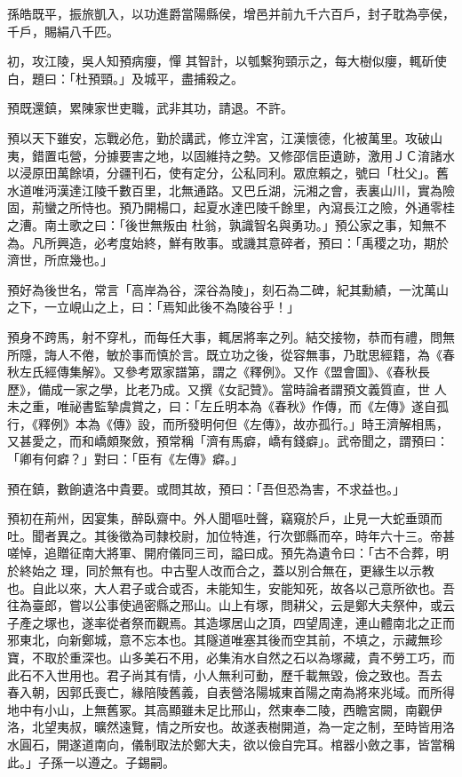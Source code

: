 \begin{pinyinscope}
 孫皓既平，振旅凱入，以功進爵當陽縣侯，增邑并前九千六百戶，封子耽為亭侯，千戶，賜絹八千匹。



 初，攻江陵，吳人知預病癭，憚
 其智計，以瓠繫狗頸示之，每大樹似癭，輒斫使白，題曰：「杜預頸。」及城平，盡捕殺之。



 預既還鎮，累陳家世吏職，武非其功，請退。不許。



 預以天下雖安，忘戰必危，勤於講武，修立泮宮，江漢懷德，化被萬里。攻破山夷，錯置屯營，分據要害之地，以固維持之勢。又修邵信臣遺跡，激用ＪＣ淯諸水以浸原田萬餘頃，分疆刊石，使有定分，公私同利。眾庶賴之，號曰「杜父」。舊水道唯沔漢達江陵千數百里，北無通路。又巴丘湖，沅湘之會，表裏山川，實為險固，荊蠻之所恃也。預乃開楊口，起夏水達巴陵千餘里，內瀉長江之險，外通零桂之漕。南土歌之曰：「後世無叛由
 杜翁，孰識智名與勇功。」預公家之事，知無不為。凡所興造，必考度始終，鮮有敗事。或譏其意碎者，預曰：「禹稷之功，期於濟世，所庶幾也。」



 預好為後世名，常言「高岸為谷，深谷為陵」，刻石為二碑，紀其勳績，一沈萬山之下，一立峴山之上，曰：「焉知此後不為陵谷乎！」



 預身不跨馬，射不穿札，而每任大事，輒居將率之列。結交接物，恭而有禮，問無所隱，誨人不倦，敏於事而慎於言。既立功之後，從容無事，乃耽思經籍，為《春秋左氏經傳集解》。又參考眾家譜第，謂之《釋例》。又作《盟會圖》、《春秋長歷》，備成一家之學，比老乃成。又撰《女記贊》。當時論者謂預文義質直，世
 人未之重，唯祕書監摯虞賞之，曰：「左丘明本為《春秋》作傳，而《左傳》遂自孤行，《釋例》本為《傳》設，而所發明何但《左傳》，故亦孤行。」時王濟解相馬，又甚愛之，而和嶠頗聚斂，預常稱「濟有馬癖，嶠有錢癖」。武帝聞之，謂預曰：「卿有何癖？」對曰：「臣有《左傳》癖。」



 預在鎮，數餉遺洛中貴要。或問其故，預曰：「吾但恐為害，不求益也。」



 預初在荊州，因宴集，醉臥齋中。外人聞嘔吐聲，竊窺於戶，止見一大蛇垂頭而吐。聞者異之。其後徵為司隸校尉，加位特進，行次鄧縣而卒，時年六十三。帝甚嗟悼，追贈征南大將軍、開府儀同三司，謚曰成。預先為遺令曰：「古不合葬，明於終始之
 理，同於無有也。中古聖人改而合之，蓋以別合無在，更緣生以示教也。自此以來，大人君子或合或否，未能知生，安能知死，故各以己意所欲也。吾往為臺郎，嘗以公事使過密縣之邢山。山上有塚，問耕父，云是鄭大夫祭仲，或云子產之塚也，遂率從者祭而觀焉。其造塚居山之頂，四望周達，連山體南北之正而邪東北，向新鄭城，意不忘本也。其隧道唯塞其後而空其前，不填之，示藏無珍寶，不取於重深也。山多美石不用，必集洧水自然之石以為塚藏，貴不勞工巧，而此石不入世用也。君子尚其有情，小人無利可動，歷千載無毀，儉之致也。吾去
 春入朝，因郭氏喪亡，緣陪陵舊義，自表營洛陽城東首陽之南為將來兆域。而所得地中有小山，上無舊冢。其高顯雖未足比邢山，然東奉二陵，西瞻宮闕，南觀伊洛，北望夷叔，曠然遠覽，情之所安也。故遂表樹開道，為一定之制，至時皆用洛水圓石，開遂道南向，儀制取法於鄭大夫，欲以儉自完耳。棺器小斂之事，皆當稱此。」子孫一以遵之。子錫嗣。




\end{pinyinscope}
